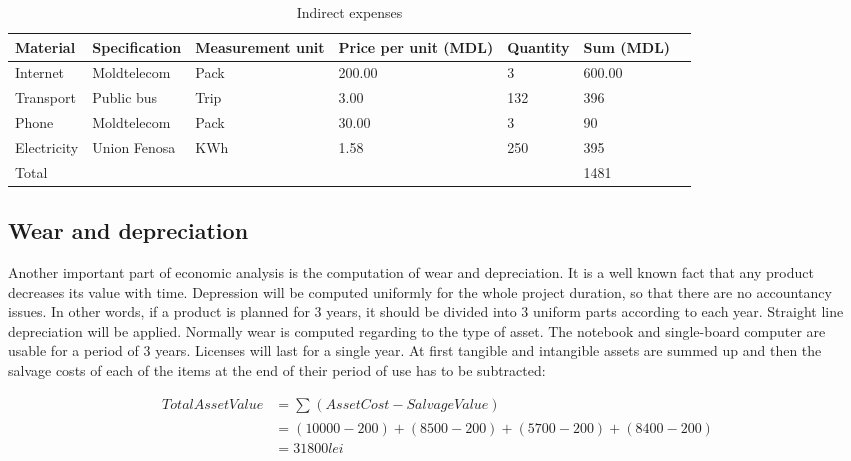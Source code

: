 \documentclass[12pt,a4paper]{report}
\begin{document}
\begin{table}[!h]
\begin{center}
\begin{tabularx}{\textwidth}{| M{5em} | Y | M{7em} | M{5em} | M{5em} | M{5em} |N}
\hline
\textbf{Material} & \textbf{Specification} & \textbf{Measurement unit} & \textbf{Price per unit (MDL)} & \textbf{Quantity} & \textbf{Sum (MDL)} &\\[18pt]
\hline
Internet & Moldtelecom & Pack & 200.00 & 3 & 600.00 &\\[14pt]
\hline
Transport & Public bus & Trip & 3.00 & 132 & 396 &\\[14pt]
\hline
Phone & Moldtelecom & Pack & 30.00 & 3 & 90 &\\[14pt]
\hline
Electricity & Union Fenosa & KWh & 1.58 & 250 & 395 &\\[14pt]
\hline
Total & & & & & 1481 &\\[14pt]
\hline
\end{tabularx}
\caption{Indirect expenses}
\label{table:indirect_expenses}
\end{center}
\end{table}

\subsection{Wear and depreciation}
Another important part of economic analysis is the computation of wear and depreciation. It is a well known fact that any product decreases its value with time. Depression will be computed uniformly for the whole project duration, so that there are no accountancy issues. In other words, if a product is planned for 3 years, it should be divided into 3 uniform parts according to each year. Straight line depreciation will be applied. Normally wear is computed regarding to the type of asset. The notebook and single-board computer are usable for a period of 3 years. Licenses will last for a single year. At first tangible and intangible assets are summed up and then the salvage costs of each of the items at the end of their period of use has to be subtracted:

\begin{equation}
 \begin{split}
  Total Asset Value &= \sum_{} (AssetCost - Salvage Value) \\
		    &= (10000 - 200) + (8500 - 200) + (5700 - 200) + (8400 - 200) \\
		    &= 31800 lei
 \end{split}
\end{equation}
\end{document}
